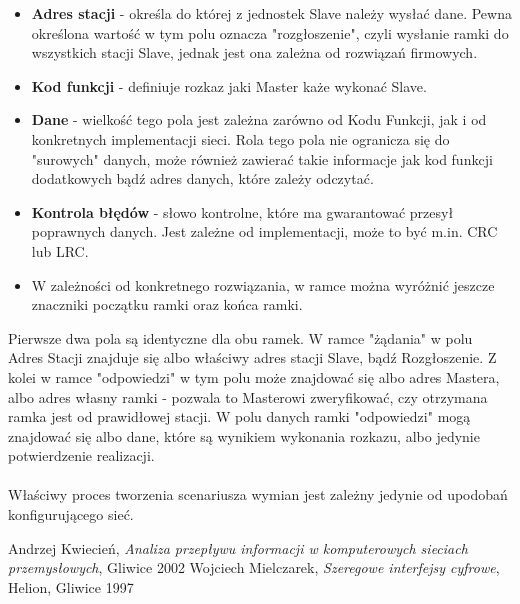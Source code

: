 \documentclass[a4paper,twoside]{article}
\begin{document}
\begin{itemize}
	\item \textbf{Adres stacji} - określa do której z jednostek Slave należy wysłać dane. Pewna określona wartość w tym polu oznacza "rozgłoszenie", czyli wysłanie ramki do wszystkich stacji Slave, jednak jest ona zależna od rozwiązań firmowych.
	\item \textbf{Kod funkcji} - definiuje rozkaz jaki Master każe wykonać Slave.
	\item \textbf{Dane} - wielkość tego pola jest zależna zarówno od Kodu Funkcji, jak i od konkretnych implementacji sieci. Rola tego pola nie ogranicza się do "surowych" danych, może również zawierać takie informacje jak kod funkcji dodatkowych bądź adres danych, które zależy odczytać.
	\item \textbf{Kontrola błędów} - słowo kontrolne, które ma gwarantować przesył poprawnych danych. Jest zależne od implementacji, może to być m.in. CRC lub LRC.
	\item W zależności od konkretnego rozwiązania, w ramce można wyróżnić jeszcze znaczniki początku ramki oraz końca ramki.
\end{itemize}
Pierwsze dwa pola są identyczne dla obu ramek. W ramce "żądania" w polu Adres Stacji znajduje się albo właściwy adres stacji Slave, bądź Rozgłoszenie. Z kolei w ramce "odpowiedzi" w tym polu może znajdować się albo adres Mastera, albo adres własny ramki - pozwala to Masterowi zweryfikować, czy otrzymana ramka jest od prawidłowej stacji. W polu danych ramki "odpowiedzi" mogą znajdować się albo dane, które są wynikiem wykonania rozkazu, albo jedynie potwierdzenie realizacji. \\\\
Właściwy proces tworzenia scenariusza wymian jest zależny jedynie od upodobań konfigurującego sieć.












\newpage
\begin{thebibliography}{2}
	 Andrzej Kwiecień, \textit{Analiza przepływu informacji w komputerowych sieciach przemysłowych}, Gliwice 2002
	 Wojciech Mielczarek, \textit{Szeregowe interfejsy cyfrowe}, Helion, Gliwice 1997
\end{thebibliography}
\end{document}

